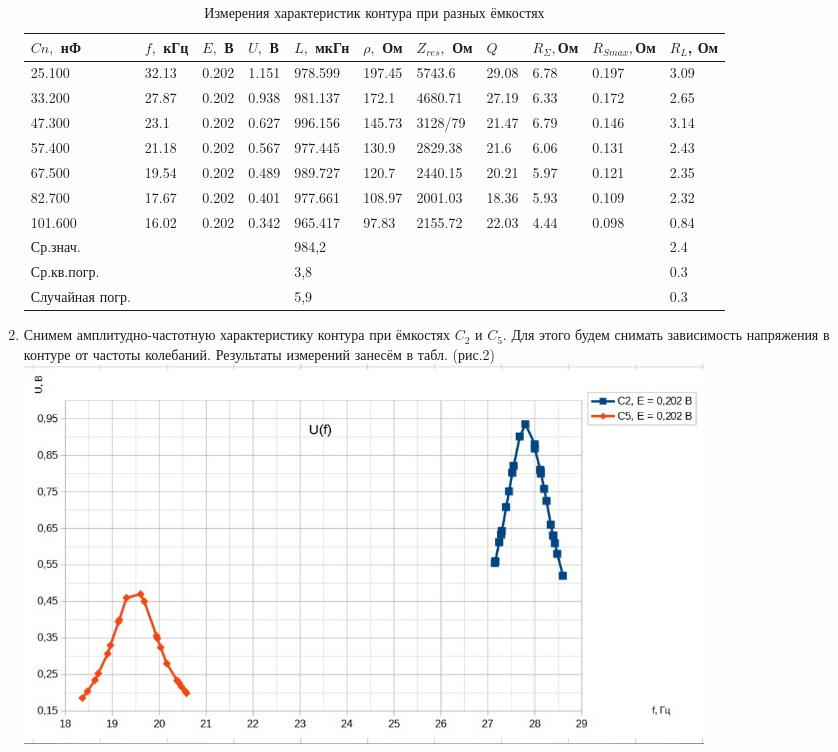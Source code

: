 \documentclass[11pt]{article}
\begin{document}
\begin{enumerate}
    \begin{table}[h]
    \centering
    \begin{center}
    \caption{Измерения характеристик контура при разных ёмкостях}
    \end{center}
    \vspace{0.1cm}
    \label{tab:my_label}
    \begin{tabular}{ |p{1.2cm}|p{1.2cm}|p{0.9cm}|p{0.9cm}|p{1.3cm}|p{1.2cm}|p{1.5cm}|p{1.2cm}|p{1.2cm}|p{1.3cm}|p{1.2cm}| }
 \hline
$Cn,$ нФ $\; \; \; \;$& $f,$ кГц & $E,$ В & $U,$ В & $L,$ мкГн & $\rho,$ Ом & $Z_{res},$ Ом & $Q$ & $R_{\Sigma}, $Ом & $R_{Smax}, $Ом & $R_L$, Ом\\
 \hline
25.100 & 32.13 & 0.202 & 1.151 & 978.599 & 197.45 & 5743.6 & 29.08 & 6.78 & 0.197 & 3.09\\
 \hline
33.200 & 27.87 & 0.202 & 0.938 & 981.137 & 172.1 & 4680.71 & 27.19 & 6.33 & 0.172 & 2.65\\
 \hline
47.300 & 23.1 & 0.202 & 0.627 & 996.156 & 145.73 & 3128/79 & 21.47 & 6.79 & 0.146 & 3.14\\
 \hline
57.400 & 21.18 & 0.202 & 0.567 & 977.445 & 130.9 & 2829.38 & 21.6 & 6.06 & 0.131 & 2.43\\
 \hline
67.500 & 19.54 & 0.202 & 0.489 & 989.727 & 120.7 & 2440.15 & 20.21 & 5.97 & 0.121 & 2.35\\
 \hline
82.700 & 17.67 & 0.202 & 0.401 & 977.661 & 108.97 & 2001.03 & 18.36 & 5.93 & 0.109 & 2.32\\
 \hline
101.600 & 16.02 & 0.202 & 0.342 & 965.417 & 97.83 & 2155.72 & 22.03 & 4.44 & 0.098 & 0.84\\
\hline
Ср.знач. & & & & 984,2& & & & & &2.4\\
\hline
Ср.кв.погр. & & & & 3,8& & & & & &0.3\\
\hline
Случайная погр. & & & &5,9 & & & & & &0.3\\
\hline
\end{tabular}
\end{table}
    \item Снимем амплитудно-частотную характеристику контура при ёмкостях $C_2$ и $C_5$. Для этого будем снимать зависимость напряжения в контуре от частоты колебаний. Результаты измерений занесём в табл. (рис.2)\\
    \includegraphics[width=18cm]{g2}\\

\end{enumerate}
\end{document}
